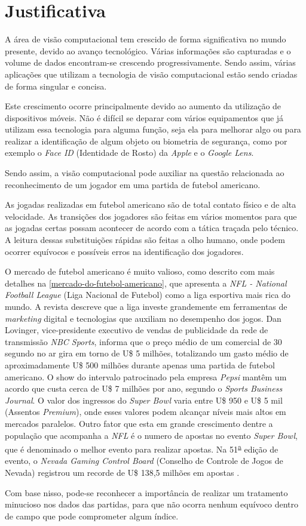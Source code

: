 \section{\textbf{Justificativa}}

A área de visão computacional tem crescido de forma significativa no mundo presente, devido ao avanço tecnológico. Várias informações são capturadas e o volume de dados encontram-se crescendo progressivamente. Sendo assim, várias aplicações que utilizam a tecnologia de visão computacional estão sendo criadas de forma singular e concisa.

Este crescimento ocorre principalmente devido ao aumento da utilização de dispositivos móveis. Não é difícil se deparar com vários equipamentos que já utilizam essa tecnologia para alguma função, seja ela para melhorar algo ou para realizar a identificação de algum objeto ou biometria de segurança, como por exemplo o \textit{Face ID} (Identidade de Rosto) da \textit{Apple} e o \textit{Google Lens}.

Sendo assim, a visão computacional pode auxiliar na questão relacionada ao reconhecimento de um jogador em uma partida de futebol americano.

As jogadas realizadas em futebol americano são de total contato físico e de alta velocidade. As transições dos jogadores são feitas em vários momentos para que as jogadas certas possam acontecer de acordo com a tática traçada pelo técnico. A leitura dessas substituições rápidas são feitas a olho humano, onde podem ocorrer equívocos e possíveis erros na identificação dos jogadores.

O mercado de futebol americano é muito valioso, como descrito com mais detalhes na \autoref{mercado-do-futebol-americano}, que apresenta a \textit{NFL - National Football League} (Liga Nacional de Futebol) como a liga esportiva mais rica do mundo. A revista  descreve que a liga investe grandemente em ferramentas de \textit{marketing} digital e tecnologias que auxiliam no desempenho dos jogos. Dan Lovinger, vice-presidente executivo de vendas de publicidade da rede de transmissão \textit{NBC Sports}, informa que o preço médio de um comercial de 30 segundo no ar gira em torno de U\$ 5 milhões, totalizando um gasto médio de aproximadamente U\$ 500 milhões durante apenas uma partida de futebol americano. O show do intervalo patrocinado pela empresa \textit{Pepsi} mantêm um acordo que custa cerca de U\$ 7 milhões por ano, segundo o \textit{Sports Business Journal}. O valor dos ingressos do \textit{Super Bowl} varia entre U\$ 950 e U\$ 5 mil (Assentos \textit{Premium}), onde esses valores podem alcançar níveis mais altos em mercados paralelos. Outro fator que esta em grande crescimento dentre a população que acompanha a \textit{NFL} é o numero de apostas no evento \textit{Super Bowl}, que é denominado o melhor evento para realizar apostas. Na 51\textsuperscript{\underline{a}} edição de evento, o \textit{Nevada Gaming Control Board} (Conselho de Controle de Jogos de Nevada) registrou um recorde de U\$ 138,5 milhões em apostas \cite{FORBES2018}.

Com base nisso, pode-se reconhecer a importância de realizar um tratamento minucioso nos dados das partidas, para que não ocorra nenhum equívoco dentro de campo que pode comprometer algum índice.